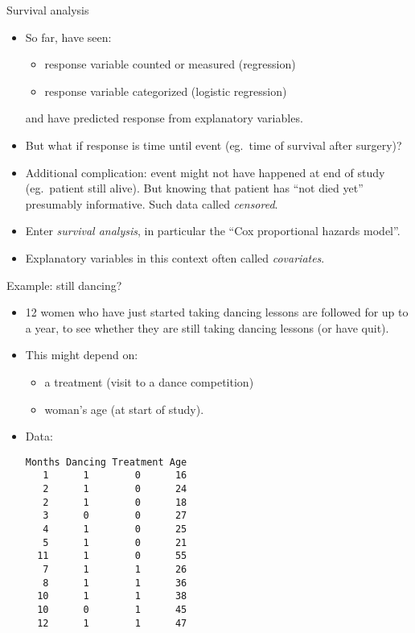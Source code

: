 \documentclass[pdf]{prosper}
\begin{document}
\begin{slide}{Survival analysis}

  \begin{itemize}
  \item So far, have seen:
    \begin{itemize}
    \item response variable counted or measured (regression)
    \item response variable categorized (logistic regression)
    \end{itemize}
    and have predicted response from explanatory variables.
  \item But what if response is time until event (eg.\ time of
    survival after surgery)?
  \item Additional complication: event might not have happened at end of study (eg.\ patient still alive). But knowing that patient has ``not died yet'' presumably informative. Such data called {\em censored}. 
  \item Enter {\em survival analysis}, in particular the ``Cox proportional hazards model''. 
  \item Explanatory variables in this context often called {\em covariates}.
  \end{itemize}

\end{slide}

\begin{slide}{Example: still dancing?}

  \begin{itemize}
  \item 12 women who have just started taking dancing lessons are
    followed for up to a year, to see whether they are still taking
    dancing lessons (or have quit).
  \item This might depend on:
    \begin{itemize}
    \item a treatment (visit to a dance competition)
    \item woman's age (at start of study).
    \end{itemize}
  \item Data:

{\scriptsize
\begin{verbatim}
Months Dancing Treatment Age
   1      1        0      16
   2      1        0      24
   2      1        0      18
   3      0        0      27
   4      1        0      25
   5      1        0      21
  11      1        0      55
   7      1        1      26
   8      1        1      36
  10      1        1      38
  10      0        1      45
  12      1        1      47
\end{verbatim}
}

  \end{itemize}
  
\end{slide}
\end{document}
